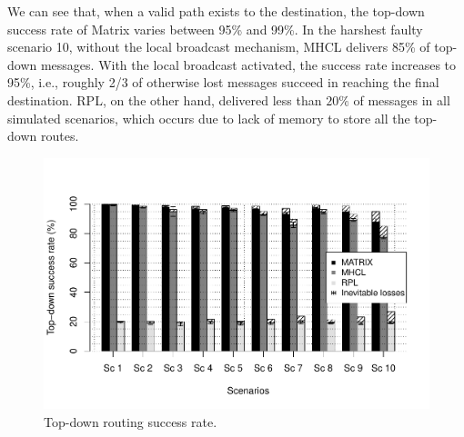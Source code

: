 We can see that, when a valid path exists to the destination, the top-down
success rate of Matrix varies between 95\% and 99\%. In the harshest
faulty scenario 10,
without the local broadcast mechanism, MHCL delivers 85\% of top-down messages.
With the local broadcast activated, the success rate increases to 95\%,
i.e., roughly 2/3 of otherwise lost messages succeed in reaching the final
destination.
RPL, on the other hand, delivered less than $20\%$ of messages in all simulated
scenarios, which occurs due to lack of memory to store all the top-down routes.

\begin{figure}[h]
    \centering
    \includegraphics[width=1\linewidth]{Images/txrouting.pdf}
    \caption{Top-down routing success rate.}
    \label{fig:txdwn}
\end{figure}
